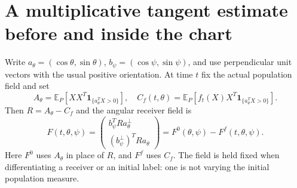 \documentclass[11pt]{article}
\theoremstyle{remark}\newtheorem{remark}[theorem]{Remark}
\newcommand{\E}{\mathbb E}
\newcommand{\one}{\mathbf1}
\begin{document}
\section{A multiplicative tangent estimate before and inside the chart}
Write $a_\theta=(\cos\theta,\sin\theta)$,
$b_\psi=(\cos\psi,\sin\psi)$, and use perpendicular unit vectors
with the usual positive orientation. At time $t$ fix the actual
population field and set
\[
 A_\theta=\E_P[XX^T\one_{\{a_\theta^TX>0\}}],\quad
 C_f(t,\theta)=\E_P[f_t(X)X^T\one_{\{a_\theta^TX>0\}}].
\]
Then $R=A_\theta-C_f$ and the angular receiver field is
\begin{equation}\label{an02owptv1:field}
 F(t,\theta,\psi)=
 \begin{pmatrix}b_\psi^TRa_\theta^\perp\\
 (b_\psi^\perp)^TRa_\theta\end{pmatrix}
 =F^0(\theta,\psi)-F^f(t,\theta,\psi).
\end{equation}
Here $F^0$ uses $A_\theta$ in place of $R$, and $F^f$ uses $C_f$.
The field is held fixed when differentiating a receiver or an initial
label: one is not varying the initial population measure.
\end{document}
